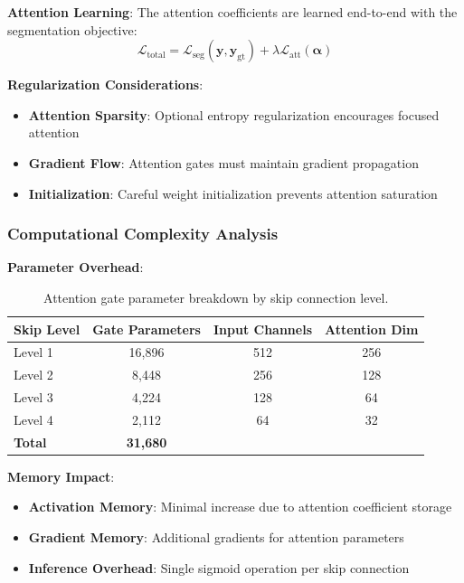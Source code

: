 \documentclass[12pt,a4paper]{article}
\begin{document}
\textbf{Attention Learning}:
The attention coefficients are learned end-to-end with the segmentation objective:
\begin{equation}
\mathcal{L}_{\text{total}} = \mathcal{L}_{\text{seg}}(\mathbf{y}, \mathbf{y}_{\text{gt}}) + \lambda \mathcal{L}_{\text{att}}(\mathbf{\alpha})
\end{equation}

\textbf{Regularization Considerations}:
\begin{itemize}
    \item \textbf{Attention Sparsity}: Optional entropy regularization encourages focused attention
    \item \textbf{Gradient Flow}: Attention gates must maintain gradient propagation
    \item \textbf{Initialization}: Careful weight initialization prevents attention saturation
\end{itemize}

\subsubsection{Computational Complexity Analysis}

\textbf{Parameter Overhead}:
\begin{table}[H]
    \centering
    \begin{tabular}{lccc}
        \toprule
        \textbf{Skip Level} & \textbf{Gate Parameters} & \textbf{Input Channels} & \textbf{Attention Dim} \\
        \midrule
        Level 1 & 16,896 & 512 & 256 \\
        Level 2 & 8,448 & 256 & 128 \\
        Level 3 & 4,224 & 128 & 64 \\
        Level 4 & 2,112 & 64 & 32 \\
        \midrule
        \textbf{Total} & \textbf{31,680} & & \\
        \bottomrule
    \end{tabular}
    \caption{Attention gate parameter breakdown by skip connection level.}
    \label{tab:attention_params}
\end{table}

\textbf{Memory Impact}:
\begin{itemize}
    \item \textbf{Activation Memory}: Minimal increase due to attention coefficient storage
    \item \textbf{Gradient Memory}: Additional gradients for attention parameters
    \item \textbf{Inference Overhead}: Single sigmoid operation per skip connection
\end{itemize}
\end{document}
